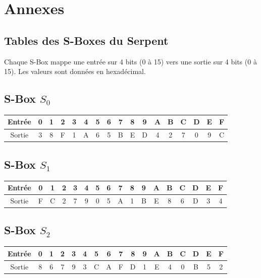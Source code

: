\documentclass[12pt,a4paper]{report}
\begin{document}
\section*{Annexes}

\setcounter{subsection}{0}

\subsection{Tables des S-Boxes du Serpent}

Chaque S-Box mappe une entrée sur 4 bits (0 à 15) vers une sortie sur 4 bits (0 à 15).  
Les valeurs sont données en hexadécimal.

\subsection*{S-Box $S_0$}
\begin{center}
\begin{tabular}{|c|cccccccccccccccc|}
\hline
Entrée & 0 & 1 & 2 & 3 & 4 & 5 & 6 & 7 & 8 & 9 & A & B & C & D & E & F \\
\hline
Sortie & 3 & 8 & F & 1 & A & 6 & 5 & B & E & D & 4 & 2 & 7 & 0 & 9 & C \\
\hline
\end{tabular}
\end{center}

\subsection*{S-Box $S_1$}
\begin{center}
\begin{tabular}{|c|cccccccccccccccc|}
\hline
Entrée & 0 & 1 & 2 & 3 & 4 & 5 & 6 & 7 & 8 & 9 & A & B & C & D & E & F \\
\hline
Sortie & F & C & 2 & 7 & 9 & 0 & 5 & A & 1 & B & E & 8 & 6 & D & 3 & 4 \\
\hline
\end{tabular}
\end{center}

\subsection*{S-Box $S_2$}
\begin{center}
\begin{tabular}{|c|cccccccccccccccc|}
\hline
Entrée & 0 & 1 & 2 & 3 & 4 & 5 & 6 & 7 & 8 & 9 & A & B & C & D & E & F \\
\hline
Sortie & 8 & 6 & 7 & 9 & 3 & C & A & F & D & 1 & E & 4 & 0 & B & 5 & 2 \\
\hline
\end{tabular}
\end{center}
\end{document}
